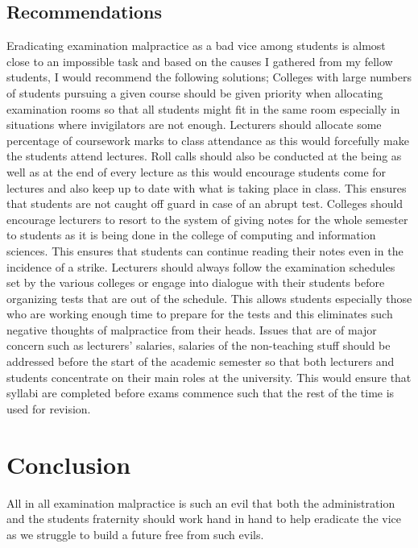 \documentclass {article}
\begin{document}
\subsection{Recommendations}
Eradicating examination malpractice as a bad vice among students is almost close to an impossible task and based on the causes I gathered from my fellow students, I would recommend the following solutions; Colleges with large numbers of students pursuing a given course should be given priority when allocating examination rooms so that all students might fit in the same room especially in situations where invigilators are not enough. Lecturers should allocate some percentage of coursework marks to class attendance as this would forcefully make the students attend lectures. Roll calls should also be conducted at the being as well as at the end of every lecture as this would encourage students come for lectures and also keep up to date with what is taking place in class.
This ensures that students are not caught off guard in case of an abrupt test.
Colleges should encourage lecturers to resort to the system of giving notes for the whole semester to students as it is being done in the college of computing and information sciences. This ensures that students can continue reading their notes even in the incidence of a strike. Lecturers should always follow the examination schedules set by the various colleges or engage into dialogue with their students before organizing tests that are out of the schedule. This allows students especially those who are working enough time to prepare for the tests and this eliminates such negative thoughts of malpractice from their heads. Issues that are of major concern such as lecturers’ salaries, salaries of the non-teaching stuff should be addressed before the start of the academic semester so that both lecturers and students concentrate on their main roles at the university. This would ensure that syllabi are completed before exams commence such that the rest of the time is used for revision.

\section{Conclusion}
All in all examination malpractice is such an evil that both the administration and the students fraternity should work hand in hand to help eradicate the vice as we struggle to build a future free from such evils.
\end{document}
